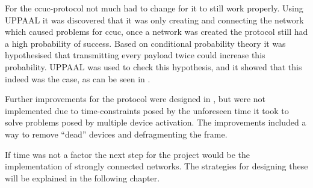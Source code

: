 \bigskip \noindent
For the \acrshort{ccuc}-protocol not much had to change for it to still work properly.
Using UPPAAL it was discovered that it was only creating and connecting the network which caused problems for \acrshort{ccuc}, once a network was created the protocol still had a high probability of success.
Based on conditional probability theory it was hypothesised that transmitting every payload twice could increase this probability.
UPPAAL was used to check this hypothesis, and it showed that this indeed was the case, as can be seen in .

Further improvements for the protocol were designed in , but were not implemented due to time-constraints posed by the unforeseen time it took to solve problems posed by multiple device activation.
The improvements included a way to remove \enquote{dead} devices and defragmenting the frame.

\bigskip \noindent
If time was not a factor the next step for the project would be the implementation of strongly connected networks.
The strategies for designing these will be explained in the following chapter.